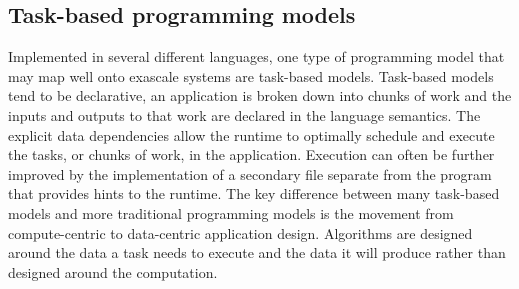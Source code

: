 \subsection{Task-based programming models}

Implemented in several different languages, one type of programming model that may map well onto exascale systems are task-based models.  Task-based models tend to be declarative, an application is broken down into chunks of work and the inputs and outputs to that work are declared in the language semantics.  The explicit data dependencies allow the runtime to optimally schedule and execute the tasks, or chunks of work, in the application.  Execution can often be further improved by the implementation of a secondary file separate from the program that provides hints to the runtime.  The key difference between many task-based models and more traditional programming models is the movement from compute-centric to data-centric application design.  Algorithms are designed around the data a task needs to execute and the data it will produce rather than designed around the computation.

